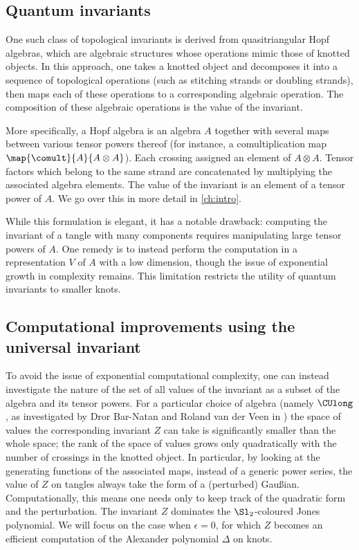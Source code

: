 \subsection{Quantum invariants}

One such class of topological invariants is derived from quasitriangular Hopf
algebras, which are algebraic structures whose operations mimic those of knotted
objects. In this approach, one takes a knotted object and decomposes it into a
sequence of topological operations (such as stitching strands or doubling
strands), then maps each of these operations to a corresponding algebraic
operation. The composition of these algebraic operations is the value of the
invariant.

More specifically, a Hopf algebra is an algebra $A$ together with several maps
between various tensor powers thereof (for instance, a comultiplication map
$\map {\comult} {A} {A \otimes A}$). Each crossing assigned an element of $A
\otimes A$. Tensor factors which belong to the same strand are concatenated by
multiplying the associated algebra elements. The value of the invariant is an
element of a tensor power of $A$. We go over this in more detail in
\cref{ch:intro}.

While this formulation is elegant, it has a notable drawback: computing the
invariant of a tangle with many components requires manipulating
large tensor powers of $A$. One remedy is to instead perform the computation in
a representation $V$ of $A$ with a low dimension, though the issue of
exponential growth in complexity remains. This limitation restricts the utility
of quantum invariants to smaller knots.

\subsection{Computational improvements using the universal invariant}
To avoid the issue of exponential computational complexity, one can instead
investigate the nature of the set of all values of the invariant as a subset of
the algebra and its tensor powers. For a particular choice of algebra (namely
$\CUlong$, as investigated by Dror Bar-Natan and Roland van der Veen in
\cite{BV}) the space of values the corresponding invariant $Z$ can take is
significantly smaller than the whole space; the rank of the space of values
grows only quadratically with the number of crossings in the knotted object. In
particular, by looking at the generating functions of the associated maps,
instead of a generic power series, the value of $Z$ on tangles always take the
form of a (perturbed) Gaußian. Computationally, this means one needs only to
keep track of the quadratic form and the perturbation. The invariant $Z$
dominates the $\Sl_2$-coloured Jones polynomial. We will focus on the case when
$ϵ=0$, for which $Z$ becomes an efficient computation of the Alexander
polynomial $Δ$ on knots.


